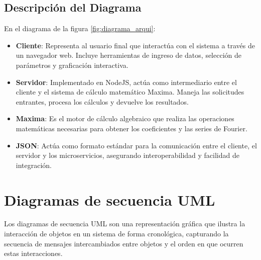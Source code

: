 \subsection{Descripción del Diagrama}

En el diagrama de la figura \ref{fig:diagrama_arqui}:

\begin{itemize}
	\item \textbf{Cliente}: Representa al usuario final que interactúa con el sistema a través de un navegador web. Incluye herramientas de ingreso de datos, selección de parámetros y graficación interactiva.
	\item \textbf{Servidor}: Implementado en NodeJS, actúa como intermediario entre el cliente y el sistema de cálculo matemático Maxima. Maneja las solicitudes entrantes, procesa los cálculos y devuelve los resultados.
	\item \textbf{Maxima}: Es el motor de cálculo algebraico que realiza las operaciones matemáticas necesarias para obtener los coeficientes y las series de Fourier.
	\item \textbf{JSON}: Actúa como formato estándar para la comunicación entre el cliente, el servidor y los microservicios, asegurando interoperabilidad y facilidad de integración.
\end{itemize}

\newpage

\section{Diagramas de secuencia UML}
Los diagramas de secuencia UML son una representación gráfica que ilustra la interacción de objetos en un sistema de forma cronológica, capturando la secuencia de mensajes intercambiados entre objetos y el orden en que ocurren estas interacciones.


